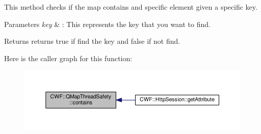This method checks if the map contains and specific element given a specific key. 


\begin{DoxyParams}{Parameters}
{\em key} & \+: This represents the key that you want to find. \\
\hline
\end{DoxyParams}
\begin{DoxyReturn}{Returns}
returns true if find the key and false if not find. 
\end{DoxyReturn}


Here is the caller graph for this function\+:
\nopagebreak
\begin{figure}[H]
\begin{center}
\leavevmode
\includegraphics[width=350pt]{class_c_w_f_1_1_q_map_thread_safety_aff60b2baf5c3d990f63dbe1d9b117ba9_icgraph}
\end{center}
\end{figure}


